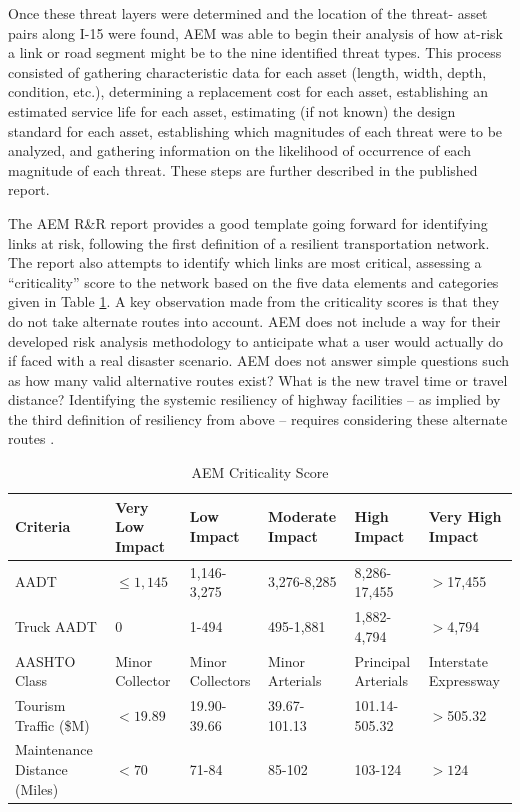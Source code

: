 Once these threat layers were determined and the location of the threat-
asset pairs along I-15
were found, AEM was able to begin their analysis of how at-risk a link or road segment might be to the nine identified threat types. This process consisted of
gathering characteristic
data for each asset (length, width, depth, condition, etc.), determining a
replacement cost for
each asset, establishing an estimated service life for each asset,
estimating (if not known) the
design standard for each asset, establishing which magnitudes of each
threat were to be analyzed,
and gathering information on the likelihood of occurrence of each
magnitude of each threat. These
steps are further described in the published report.

The AEM R\&R report provides a good template going forward for identifying
links at risk,
following the first definition of a resilient transportation network. The
report also attempts to
identify which links are most critical, assessing a “criticality”
score to the network
based on the five data elements and categories given in Table \ref{tab:aemscore}. A key observation made from the
criticality scores is that they do not take alternate routes into account. AEM does not include a way for their developed risk analysis methodology to anticipate what a user would actually do if faced with a real disaster scenario. AEM does not answer simple questions such as how many valid alternative routes exist? What is the new travel time or travel distance? Identifying the systemic resiliency of highway facilities
– as implied by the third definition of resiliency from above – requires considering
these alternate routes \citep{aem2017}.

\begin{table}

\caption{AEM Criticality Score}
\label{tab:aemscore}
\centering
\begin{tabular}[t]{llllll}
\toprule
Criteria & Very Low Impact & Low Impact & Moderate Impact & High Impact & Very High Impact\\
\midrule
AADT & $\leq 1,145$ & 1,146-3,275 & 3,276-8,285 & 8,286-17,455 & $>$17,455\\
Truck AADT & 0 & 1-494 & 495-1,881 & 1,882-4,794 & $>$4,794\\
AASHTO Class & Minor Collector & Minor Collectors & Minor Arterials & Principal Arterials & Interstate Expressway\\
Tourism Traffic (\$M) & $<19.89$ & 19.90-39.66 & 39.67-101.13 & 101.14-505.32 & $>$505.32\\
Maintenance Distance (Miles) & $<70$ & 71-84 & 85-102 & 103-124 & $>124$\\
\bottomrule
\end{tabular}
\end{table}

